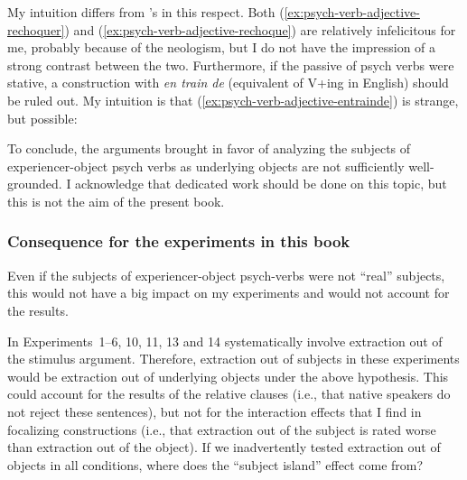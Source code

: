 \eal
{}
\zl 

My intuition differs from \citeauthor{Legendre.1989}'s in this respect. Both (\ref{ex:psych-verb-adjective-rechoquer}) and (\ref{ex:psych-verb-adjective-rechoque}) are relatively infelicitous for me, probably because of the neologism, but I do not have the impression of a strong contrast between the two. 
Furthermore, if the passive of psych verbs were stative, a construction with \emph{en train de} (equivalent of V+ing in English) should be ruled out. My intuition is that (\ref{ex:psych-verb-adjective-entrainde}) is strange, but possible:

\label{ex:psych-verb-adjective-entrainde}
\z 

To conclude, the arguments brought in favor of analyzing the subjects of experiencer-object psych verbs as underlying objects are not sufficiently well-grounded. I acknowledge that dedicated work should be done on this topic, but this is not the aim of the present book.


\subsubsection{Consequence for the experiments in this book}
\label{ch:psych-verb-no-consequence}

Even if the subjects of experiencer-object psych-verbs were not ``real'' subjects, this would not have a big impact on my experiments and would not account for the results.

In Experiments~1--6, 10, 11, 13 and 14 systematically involve extraction out of the stimulus argument. 
Therefore, extraction out of subjects in these experiments would be extraction out of underlying objects under the above hypothesis. This could account for the results of the relative clauses (i.e., that native speakers do not reject these sentences), but not for the interaction effects that I find in focalizing constructions (i.e., that extraction out of the subject is rated worse than extraction out of the object). If we inadvertently tested extraction out of objects in all conditions, where does the ``subject island'' effect come from?

